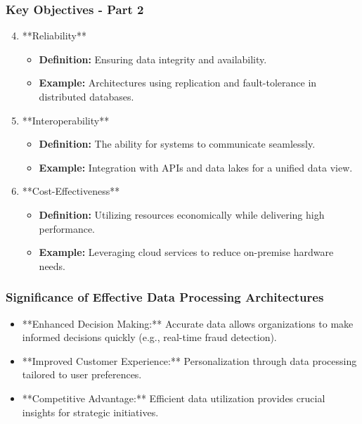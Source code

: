 \documentclass[aspectratio=169]{beamer}
\begin{document}
\begin{frame}[fragile]
    \frametitle{Key Objectives - Part 2}
    \begin{enumerate}
        \setcounter{enumi}{3}
        \item **Reliability**
        \begin{itemize}
            \item \textbf{Definition:} Ensuring data integrity and availability.
            \item \textbf{Example:} Architectures using replication and fault-tolerance in distributed databases.
        \end{itemize}

        \item **Interoperability**
        \begin{itemize}
            \item \textbf{Definition:} The ability for systems to communicate seamlessly.
            \item \textbf{Example:} Integration with APIs and data lakes for a unified data view.
        \end{itemize}

        \item **Cost-Effectiveness**
        \begin{itemize}
            \item \textbf{Definition:} Utilizing resources economically while delivering high performance.
            \item \textbf{Example:} Leveraging cloud services to reduce on-premise hardware needs.
        \end{itemize}
    \end{enumerate}
\end{frame}

\begin{frame}[fragile]
    \frametitle{Significance of Effective Data Processing Architectures}
    \begin{itemize}
        \item **Enhanced Decision Making:** Accurate data allows organizations to make informed decisions quickly (e.g., real-time fraud detection).
        
        \item **Improved Customer Experience:** Personalization through data processing tailored to user preferences.
        
        \item **Competitive Advantage:** Efficient data utilization provides crucial insights for strategic initiatives.
    \end{itemize}
\end{frame}
\end{document}
